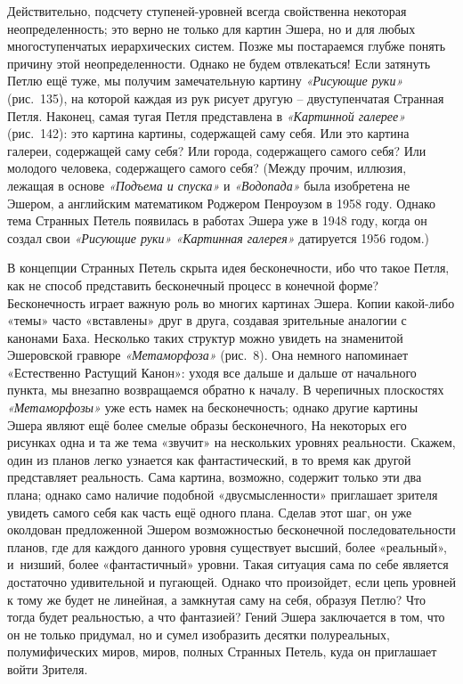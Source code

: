 \documentclass[../main.tex]{subfiles}
\begin{document}
Действительно, подсчету ступеней-уровней всегда свойственна некоторая неопределенность; это верно не только для картин Эшера, но и для любых многоступенчатых иерархических систем. Позже мы постараемся глубже понять причину этой неопределенности. Однако не будем отвлекаться! Если затянуть Петлю ещё туже, мы получим замечательную картину \emph{«Рисующие руки»} (рис.~135), на которой каждая из рук рисует другую \--- двуступенчатая Странная Петля. Наконец, самая тугая Петля представлена в \emph{«Картинной галерее»} (рис.~142): это картина картины, содержащей саму себя. Или это картина галереи, содержащей саму себя? Или города, содержащего самого себя? Или молодого человека, содержащего самого себя? (Между прочим, иллюзия, лежащая в основе \emph{«Подъема и спуска»} и \emph{«Водопада»} была изобретена не Эшером, а английским математиком Роджером Пенроузом в 1958 году. Однако тема Странных Петель появилась в работах Эшера уже в 1948 году, когда он создал свои \emph{«Рисующие руки» «Картинная галерея»} датируется 1956 годом.)

В концепции Странных Петель скрыта идея бесконечности, ибо что такое Петля, как не способ представить бесконечный процесс в конечной форме? Бесконечность играет важную роль во многих картинах Эшера. Копии какой-либо «темы» часто «вставлены» друг в друга, создавая зрительные аналогии с канонами Баха. Несколько таких структур можно увидеть на знаменитой Эшеровской гравюре \emph{«Метаморфоза»} (рис.~8). Она немного напоминает «Естественно Растущий Канон»: уходя все дальше и дальше от начального пункта, мы внезапно возвращаемся обратно к началу. В черепичных плоскостях \emph{«Метаморфозы»} уже есть намек на бесконечность; однако другие картины Эшера являют ещё более смелые образы бесконечного, На некоторых его рисунках одна и та же тема «звучит» на нескольких уровнях реальности. Скажем, один из планов легко узнается как фантастический, в то время как другой представляет реальность. Сама картина, возможно, содержит только эти два плана; однако само наличие подобной «двусмысленности» приглашает зрителя увидеть самого себя как часть ещё одного плана. Сделав этот шаг, он уже околдован предложенной Эшером возможностью бесконечной последовательности планов, где для каждого данного уровня существует высший, более «реальный», и~низший, более «фантастичный» уровни. Такая ситуация сама по себе является достаточно удивительной и пугающей. Однако что произойдет, если цепь уровней к тому же будет не линейная, а замкнутая саму на себя, образуя Петлю? Что тогда будет реальностью, а что фантазией? Гений Эшера заключается в том, что он не только придумал, но и сумел изобразить десятки полуреальных, полумифических миров, миров, полных Странных Петель, куда он приглашает войти Зрителя.
\end{document}
